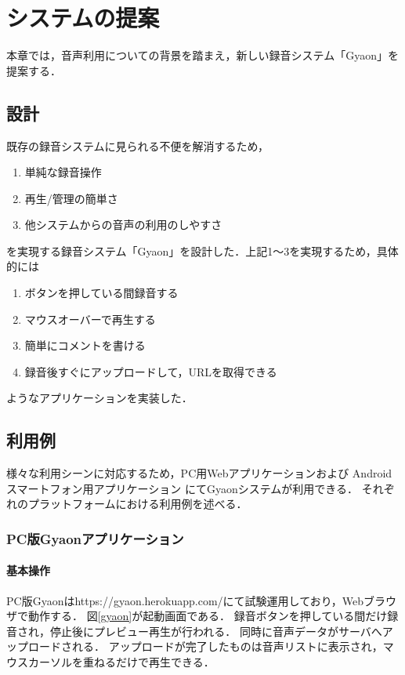 \chapter{システムの提案}
\label{chap:proposal}

本章では，音声利用についての背景を踏まえ，新しい録音システム「Gyaon」を提案する．

\newpage

\section{設計}

既存の録音システムに見られる不便を解消するため，

\begin{enumerate}
\item 単純な録音操作
\item 再生/管理の簡単さ
\item 他システムからの音声の利用のしやすさ
\end{enumerate}

を実現する録音システム「Gyaon」を設計した．上記1〜3を実現するため，具体的には

\begin{enumerate}
\item ボタンを押している間録音する
\item マウスオーバーで再生する
\item 簡単にコメントを書ける
\item 録音後すぐにアップロードして，URLを取得できる
\end{enumerate}

ようなアプリケーションを実装した．

\section{利用例}
様々な利用シーンに対応するため，PC用Webアプリケーションおよび
Androidスマートフォン用アプリケーション
にてGyaonシステムが利用できる．
それぞれのプラットフォームにおける利用例を述べる．

\subsection{PC版Gyaonアプリケーション}

\subsubsection{基本操作}
PC版Gyaonはhttps://gyaon.herokuapp.com/にて試験運用しており，Webブラウザで動作する．
図\ref{gyaon}が起動画面である．
録音ボタンを押している間だけ録音され，停止後にプレビュー再生が行われる．
同時に音声データがサーバへアップロードされる．
アップロードが完了したものは音声リストに表示され，マウスカーソルを重ねるだけで再生できる．


